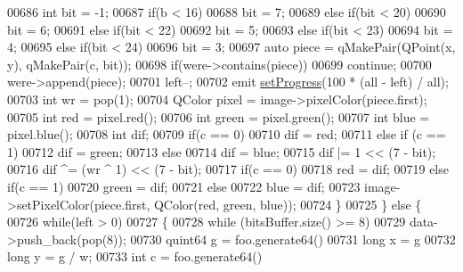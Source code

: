 \begin{DoxyCode}
00686             \textcolor{keywordtype}{int} bit = -1;
00687             \textcolor{keywordflow}{if}(b < 16)
00688                 bit = 7;
00689             \textcolor{keywordflow}{else} \textcolor{keywordflow}{if}(bit < 20)
00690                 bit = 6;
00691             \textcolor{keywordflow}{else} \textcolor{keywordflow}{if}(bit < 22)
00692                 bit = 5;
00693             \textcolor{keywordflow}{else} \textcolor{keywordflow}{if}(bit < 23)
00694                 bit = 4;
00695             \textcolor{keywordflow}{else} \textcolor{keywordflow}{if}(bit < 24)
00696                 bit = 3;
00697             \textcolor{keyword}{auto} piece = qMakePair(QPoint(x, y), qMakePair(c, bit));
00698             \textcolor{keywordflow}{if}(were->contains(piece))
00699                 \textcolor{keywordflow}{continue};
00700             were->append(piece);
00701             left--;
00702             emit \hyperlink{class_model_p_c_afdcd80f0ed5062e145a71f09b0897547}{setProgress}(100 * (all - left) / all);
00703             \textcolor{keywordtype}{int} wr = pop(1);
00704             QColor pixel = image->pixelColor(piece.first);
00705             \textcolor{keywordtype}{int} red = pixel.red();
00706             \textcolor{keywordtype}{int} green = pixel.green();
00707             \textcolor{keywordtype}{int} blue = pixel.blue();
00708             \textcolor{keywordtype}{int} dif;
00709             \textcolor{keywordflow}{if}(c == 0)
00710                 dif = red;
00711             \textcolor{keywordflow}{else} \textcolor{keywordflow}{if} (c == 1)
00712                 dif = green;
00713             \textcolor{keywordflow}{else}
00714                 dif = blue;
00715             dif |= 1 << (7 - bit);
00716             dif ^= (wr ^ 1) << (7 - bit);
00717             \textcolor{keywordflow}{if}(c == 0)
00718                 red = dif;
00719             \textcolor{keywordflow}{else} \textcolor{keywordflow}{if}(c == 1)
00720                 green = dif;
00721             \textcolor{keywordflow}{else}
00722                 blue = dif;
00723             image->setPixelColor(piece.first, QColor(red, green, blue));
00724         \}
00725     \} \textcolor{keywordflow}{else} \{
00726         \textcolor{keywordflow}{while}(left > 0)
00727         \{
00728             \textcolor{keywordflow}{while} (bitsBuffer.size() >= 8)
00729                 data->push\_back(pop(8));
00730             quint64 g = foo.generate64() %
00731             \textcolor{keywordtype}{long} x = g %
00732             \textcolor{keywordtype}{long} y = g / w;
00733             \textcolor{keywordtype}{int} c = foo.generate64() %

\end{DoxyCode}
